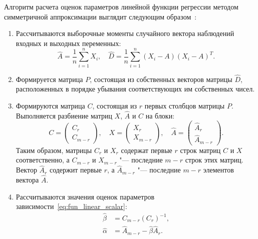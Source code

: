Алгоритм расчета оценок параметров линейной функции регрессии
методом симметричной аппроксимации выглядит следующим образом~\cite{mukha_2016}:
\begin{enumerate}
\item Рассчитываются выборочные моменты случайного вектора наблюдений входных и выходных переменных:
  \begin{equation*}
    \hat{A} = \dfrac{1}{n} \sum_{i=1}^n X_i, \quad
    \hat{D} = \dfrac{1}{n}  \sum_{i=1}^n (X_i - A) (X_i - A)^T.
  \end{equation*}
\item Формируется матрица \( P \), состоящая из собственных векторов матрицы \( \hat{D} \),
  расположенных в порядке убывания соответствующих им собственных чисел.
\item Формируются матрица \( C \), состоящая из \( r \) первых столбцов матрицы
  \( P \). Выполняется разбиение матриц \( X \), \( \hat{A} \) и \( C \) на блоки:
  \begin{equation*}
    C =
    \begin{pmatrix}
      C_r \\
      C_{m-r}
    \end{pmatrix}, \quad
    X =
    \begin{pmatrix}
      X_r \\
      X_{m-r}
    \end{pmatrix}, \quad
    \hat{A} =
    \begin{pmatrix}
      \hat{A}_r \\
      \hat{A}_{m-r}
    \end{pmatrix}.
  \end{equation*}
  Таким образом, матрицы \( C_r \) и \( X_r \) содержат первые \( r \) строк матриц
  \( C \) и \( X \) соответственно,
  а \( C_{m-r} \) и \( X_{m-r} \) "--- последние \( m - r \) строк этих матриц.
  Вектор \( \hat{A}_r \) содержит первые \( r \),
  а \( \hat{A}_{m-r} \) "--- последние \( m - r \) элементов вектора \( \hat{A} \).
\item Рассчитываются значения оценок параметров зависимости~\eqref{eq:fun_linear_scalar}:
  \begin{equation*}
    \begin{aligned}
      \hat{\beta} &= C_{m-r} (C_r)^{-1}, \\
      \hat{\alpha} &= \hat{A}_{m-r} - \hat{\beta} \hat{A}_r.
    \end{aligned}
  \end{equation*}
\end{enumerate}

